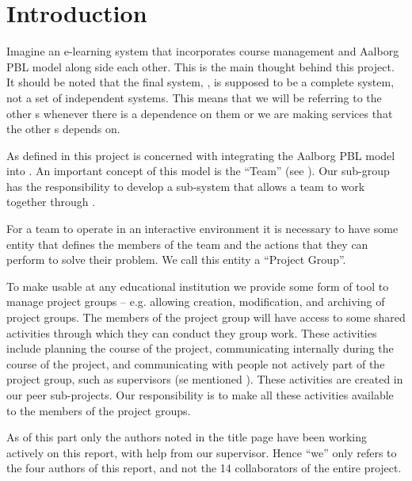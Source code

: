 \chapter{Introduction}
\label{chap:introProjectgroup}
Imagine an e-learning system that incorporates course management and Aalborg PBL model along side each other.
This is the main thought behind this project.
It should be noted that the final system, \system{}, is supposed to be a complete system, not a set of independent systems.
This means that we will be referring to the other \subsystem{}s whenever there is a dependence on them or we are making services that the other \subsystem{}s depends on.



As defined in  this project is concerned with integrating the Aalborg PBL model into \moodle.
An important concept of this model is the ``Team'' (see ).
Our sub-group has the responsibility to develop a sub-system that allows a team to work together through \moodle.



For a team to operate in an interactive environment it is necessary to have some entity that defines the members of the team and the actions that they can perform to solve their problem.
We call this entity a ``Project Group''.



To make \system{} usable at any educational institution we provide some form of tool to manage project groups -- e.g. allowing  creation, modification, and archiving of project groups.
The members of the project group will have access to some shared activities through which they can conduct they group work.
These activities include planning the course of the project, communicating internally during the course of the project, and communicating with people not actively part of the project group, such as supervisors (se mentioned ).
These activities are created in our peer sub-projects.
Our responsibility is to make all these activities available to the members of the project groups.



As of this part only the authors noted in the title page have been working actively on this report, with help from our supervisor.
Hence ``we'' only refers to the four authors of this report, and not the 14 collaborators of the entire project.
